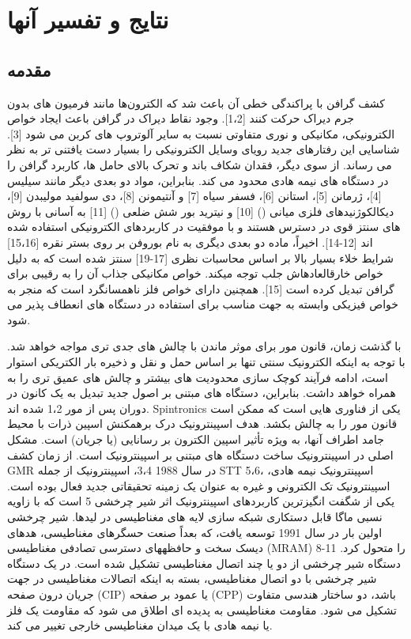 \chapter{نتایج و تفسیر آنها}
\clearpage
\section{مقدمه}
کشف گرافن با پراکندگی خطی آن باعث شد که الکترون‌ها مانند فرمیون های بدون جرم دیراک حرکت کنند [1،2]. وجود نقاط دیراک در گرافن باعث ایجاد خواص الکترونیکی، مکانیکی و نوری متفاوتی نسبت به سایر آلوتروپ های کربن می شود [3]. شناسایی این رفتارهای جدید رویای وسایل الکترونیکی را بسیار دست یافتنی تر به نظر می رساند. از سوی دیگر، فقدان شکاف باند و تحرک بالای حامل ها، کاربرد گرافن را در دستگاه های نیمه هادی محدود می کند. بنابراین، مواد دو بعدی دیگر مانند سیلیس [4]، ژرمانن [5]، استانن [6]، فسفر سیاه [7] و آنتیمونن [8]، دی سولفید مولیبدن [9]، دیکالکوژنیدهای فلزی میانی () [10] و نیترید بور شش ضلعی () [11] به آسانی با روش های سنتز قوی در دسترس هستند و با موفقیت در کاربردهای الکترونیکی استفاده شده اند [12-14]. اخیراً، ماده دو بعدی دیگری به نام بوروفن بر روی بستر نقره [15،16] شرایط خلاء بسیار بالا بر اساس محاسبات نظری [17-19] سنتز شده است که به دلیل خواص خارقالعادهاش جلب توجه میکند. خواص مکانیکی جذاب آن را به رقیبی برای گرافن تبدیل کرده است [15]. همچنین دارای خواص فلز ناهمسانگرد است که منجر به خواص فیزیکی وابسته به جهت مناسب برای استفاده در دستگاه های انعطاف پذیر می شود.

با گذشت زمان، قانون مور برای موثر ماندن با چالش های جدی تری مواجه خواهد شد. با توجه به اینکه الکترونیک سنتی تنها بر اساس حمل و نقل و ذخیره بار الکتریکی استوار است، ادامه فرآیند کوچک سازی محدودیت های بیشتر و چالش های عمیق تری را به همراه خواهد داشت. بنابراین، دستگاه های مبتنی بر اصول جدید تبدیل به یک کانون در دوران پس از مور 1،2 شده اند. Spintronics یکی از فناوری هایی است که ممکن است قانون مور را به چالش بکشد. هدف اسپینترونیک درک برهمکنش اسپین ذرات با محیط جامد اطراف آنها، به ویژه تأثیر اسپین الکترون بر رسانایی (یا جریان) است. مشکل اصلی در اسپینترونیک ساخت دستگاه های مبتنی بر اسپینترونیک است. از زمان کشف GMR در سال 1988 3،4، اسپینترونیک از جمله STT 5،6، اسپینترونیک نیمه هادی، اسپینترونیک تک الکترونی و غیره به عنوان یک زمینه تحقیقاتی جدید فعال بوده است. یکی از شگفت انگیزترین کاربردهای اسپینترونیک اثر شیر چرخشی 5 است که با زاویه نسبی ماگا قابل دستکاری شبکه سازی لایه های مغناطیسی در لیدها. شیر چرخشی اولین بار در سال 1991 توسعه یافت، که بعداً صنعت حسگرهای مغناطیسی، هدهای دیسک سخت و حافظههای دسترسی تصادفی مغناطیسی (MRAM) 8-11 را متحول کرد. دستگاه شیر چرخشی از دو یا چند اتصال مغناطیسی تشکیل شده است. در یک دستگاه شیر چرخشی با دو اتصال مغناطیسی، بسته به اینکه اتصالات مغناطیسی در جهت جریان درون صفحه (CIP) یا عمود بر صفحه (CPP) باشد، دو ساختار هندسی متفاوت تشکیل می شود. مقاومت مغناطیسی به پدیده ای اطلاق می شود که مقاومت یک فلز یا نیمه هادی با یک میدان مغناطیسی خارجی تغییر می کند.

